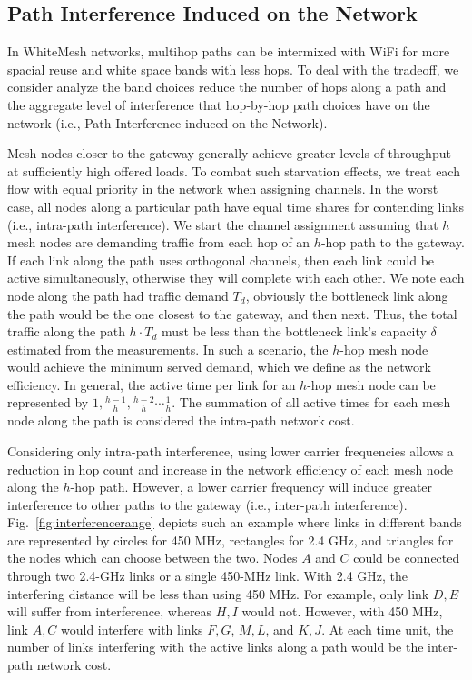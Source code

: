 \subsection{Path Interference Induced on the Network}
\label{subsec:PEN}

In WhiteMesh networks, multihop paths can be intermixed with WiFi 
for more spacial reuse and white space bands with less hops.  
To deal with the tradeoff, we consider
analyze the band choices reduce the number of hops along a path and the 
aggregate level of interference that hop-by-hop path choices have
on the network (i.e., Path Interference induced on the Network).

Mesh nodes closer to the gateway generally achieve
greater levels of throughput at sufficiently high offered loads. 
To combat such starvation effects, we treat each flow with equal priority in the network when
assigning channels. In the worst case, all nodes along a particular path have equal 
time shares for contending links (i.e., intra-path interference).
We start the channel assignment assuming that $h$ mesh nodes are demanding
traffic from each hop of an $h$-hop path to the gateway. If each link along the 
path uses orthogonal channels, then each link could be active simultaneously,
otherwise they will complete with each other. 
We note each node along the path had traffic demand $T_d$, obviously the bottleneck 
link along the path would be the one closest to the gateway, and then next. 
Thus, the total traffic along the path $h \cdot T_d$ must be less than the 
bottleneck link's capacity $\delta$ estimated from the measurements. In such a scenario, the $h$-hop mesh node 
would achieve the minimum served demand, which we define as the network efficiency. 
In general, the active time per link for an $h$-hop mesh node can be represented 
by $1,\frac{h-1}{h},\frac{h-2}{h}\cdots \frac{1}{h}$. The summation of all active 
times for each mesh node along the path is considered the intra-path network cost.

Considering only intra-path interference, using lower carrier frequencies allows a
reduction in hop count and increase in the network efficiency of each mesh node along
the $h$-hop path. However, a lower carrier frequency will induce greater interference
to other paths to the gateway (i.e., inter-path interference). 
Fig.~\ref{fig:interferencerange} depicts such an example where
links in different bands are represented by circles for 450 MHz, rectangles for
2.4 GHz, and triangles for the nodes which can choose between the two.
Nodes $A$ and $C$ could be connected through two 2.4-GHz links or a single 450-MHz link.
With 2.4 GHz, the interfering distance will be less than using 450 MHz. For example, only 
link $D,E$ will suffer from interference, whereas $H,I$ would not. However, with 450 MHz,
link $A,C$ would interfere with links $F,G$, $M,L$, and $K,J$. At each time unit, the number of
links interfering with the active links along a path would be the inter-path network cost.

